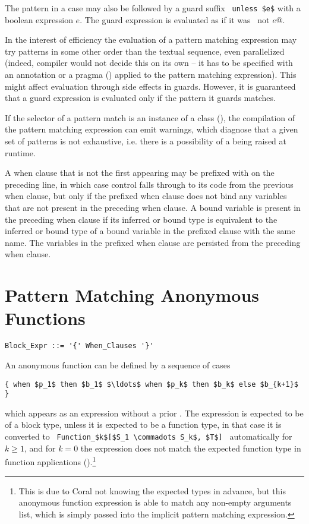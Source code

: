 The pattern in a case may also be followed by a guard suffix ~\lstinline!unless $e$! with a boolean expression $e$. The guard expression is evaluated as if it was ~\lstinline@if not $e$@. 

In the interest of efficiency the evaluation of a pattern matching expression may try patterns in some other order than the textual sequence, even parallelized (indeed, compiler would not decide this on its own -- it has to be specified with an annotation or a pragma () applied to the pattern matching expression). This might affect evaluation through side effects in guards. However, it is guaranteed that a guard expression is evaluated only if the pattern it guards matches.

If the selector of a pattern match is an instance of a  class (), the compilation of the pattern matching expression can emit warnings, which diagnose that a given set of patterns is not exhaustive, i.e. there is a possibility of a  being raised at runtime. 

A when clause that is not the first appearing may be prefixed with  on the preceding line, in which case control falls through to its code from the previous when clause, but only if the prefixed when clause does not bind any variables that are not present in the preceding when clause. A bound variable is present in the preceding when clause if its inferred or bound type is equivalent to the inferred or bound type of a bound variable in the prefixed clause with the same name. The variables in the prefixed when clause are persisted from the preceding when clause. 






\section{Pattern Matching Anonymous Functions}
\label{sec:pattern-matching-anon-fun}

\syntax\begin{lstlisting}
Block_Expr ::= '{' When_Clauses '}'
\end{lstlisting}

An anonymous function can be defined by a sequence of cases
\begin{lstlisting}
{ when $p_1$ then $b_1$ $\ldots$ when $p_k$ then $b_k$ else $b_{k+1}$ }
\end{lstlisting}
which appears as an expression without a prior . The expression is expected to be of a block type, unless it is expected to be a function type, in that case it is converted to ~\lstinline!Function_$k$[$S_1 \commadots S_k$, $T$]!~ automatically for $k \geq 1$, and for $k = 0$ the expression does not match the expected function type in function applications ().\footnote{This is due to Coral not knowing the expected types in advance, but this anonymous function expression is able to match any non-empty arguments list, which is simply passed into the implicit pattern matching expression.} 

